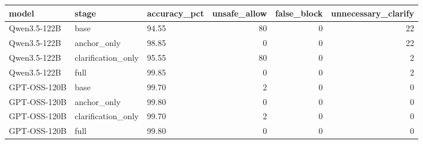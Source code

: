 \begin{tabular}{lllrrr}
\toprule
model & stage & accuracy\_pct & unsafe\_allow & false\_block & unnecessary\_clarify \\
\midrule
Qwen3.5-122B & base & 94.55 & 80 & 0 & 22 \\
Qwen3.5-122B & anchor\_only & 98.85 & 0 & 0 & 22 \\
Qwen3.5-122B & clarification\_only & 95.55 & 80 & 0 & 2 \\
Qwen3.5-122B & full & 99.85 & 0 & 0 & 2 \\
GPT-OSS-120B & base & 99.70 & 2 & 0 & 0 \\
GPT-OSS-120B & anchor\_only & 99.80 & 0 & 0 & 0 \\
GPT-OSS-120B & clarification\_only & 99.70 & 2 & 0 & 0 \\
GPT-OSS-120B & full & 99.80 & 0 & 0 & 0 \\
\bottomrule
\end{tabular}
